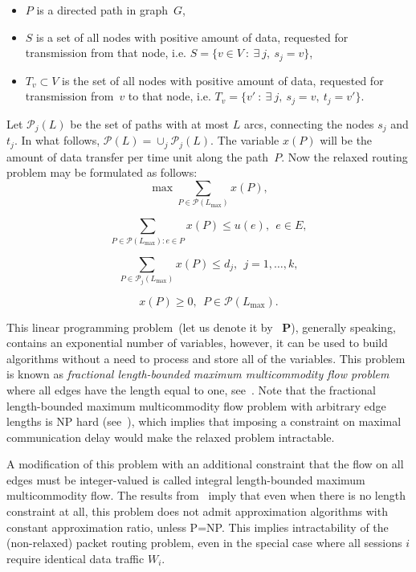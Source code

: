 \documentclass{ifacconf}
\begin{document}
\begin{itemize}
 \item $P$ is a directed path in graph~$G$,
 \item $S$ is a set of all nodes with positive amount of data, requested for transmission from that node, i.e.
$S=\{v\in V\ : \ \exists \ j, \ s_j=v\}$,
 \item $T_v\subset V$ is the set of all nodes with positive amount of data, requested for transmission from~$v$ to that node, i.e.
$T_v=\{v'\ : \ \exists \ j, \ s_j=v,\ t_j=v'\}$.
\end{itemize}

Let ${\mathcal P}_{j}(L)$ be the set of paths with at most  $L$ arcs, connecting the nodes $s_j$ and $t_j$. In what follows, ${\mathcal
P}(L)=\cup_j {\mathcal P}_j(L).$ The variable $x(P)$ will be the amount of data transfer per time unit along the path~$P$. Now the relaxed routing problem may be formulated as follows:
\begin{equation} \label{eqn:crit1}
\max \sum_{P\in {\mathcal P}(L_{\max})} x(P),
\end{equation}

\begin{equation}\label{eqn:capas}
\sum_{P\in {\mathcal P}(L_{\max}) : e \in P}  x(P) \le u(e), \ \ e\in
E,
\end{equation}

\begin{equation}\label{eqn:dem}
\sum_{P\in {\mathcal P}_j(L_{\max})}  x(P) \le d_j, \ \ j=1,\dots,k,
\end{equation}

\begin{equation}\label{eqn:pos}
x(P) \ge 0, \ \ P\in {\mathcal P}(L_{\max}).
\end{equation}

This linear programming problem~(let us denote it by~{\bf
P}), generally speaking, contains an exponential number of variables,
however, it can be used to build algorithms without
a need to process and store all of the variables. This problem is known as 
{\em fractional length-bounded maximum multicommodity flow problem}
where all edges have the length equal to one, see~\cite{Baier03,BEHTV19}.
Note that the fractional length-bounded maximum multicommodity flow problem with arbitrary edge lengths is NP hard (see~\cite{Baier03}), 
which implies that imposing a constraint on maximal communication delay would make the relaxed problem
intractable.

A modification of this problem with
an additional constraint that the flow on all edges must be
integer-valued is called integral length-bounded maximum multicommodity flow. The
results from~\cite{GVY97} imply that even when there is no length
constraint at all, this problem does not admit approximation
algorithms with constant approximation ratio, unless P=NP. This implies intractability of the (non-relaxed) packet routing problem, even in
the special case where all sessions $i$ require identical data traffic $W_i$.
\end{document}
